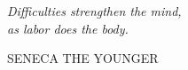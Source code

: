 \clearpage
\newpage

\thispagestyle{empty}
\null\vfill

{\settowidth{}
\centering
\parbox{\longest}{%
  \raggedright{\huge\itshape%
   Difficulties strengthen the mind, \\
   as labor does the body.\par\bigskip
  }   
  \raggedleft\Large\MakeUppercase{Seneca the Younger}\par%
}
}

\vfill\vfill

\clearpage